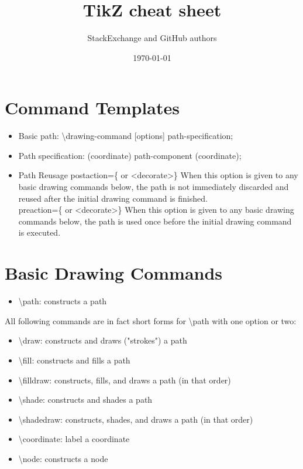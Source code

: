 \documentclass[a4paper,10pt]{article}
\newcommand{\myCode}[1]{\colorbox{gray!30}{#1}}
\begin{document}
\title{TikZ cheat sheet}
\author{StackExchange and GitHub authors}
\date{\today}

\section*{Command Templates}
\begin{itemize}
    \item Basic path: \myCode{\textbackslash drawing-command [options] path-specification;}
    \item Path specification: \myCode{(coordinate) path-component (coordinate);}
    \item Path Reusage  \myCode{postaction=\{<basic drawing commands> or <decorate>\}} When this option is given to any basic drawing commands below, the path is not immediately discarded and reused after the initial drawing command is finished. \\
            \myCode{preaction=\{<basic drawing commands> or <decorate>\}} When this option is given to any basic drawing commands below, the path is used once before the initial drawing command is executed. 
\end{itemize}

\section*{Basic Drawing Commands}
\begin{itemize}
    \item \myCode{\textbackslash path}: constructs a path
\end{itemize}

All following commands are in fact short forms for \myCode{\textbackslash path} with one option or two:
\begin{itemize}
    \item \myCode{\textbackslash draw}: constructs and draws ("strokes") a path
    \item \myCode{\textbackslash fill}: constructs and fills a path
    \item \myCode{\textbackslash filldraw}: constructs, fills, and draws a path (in that order)
    \item \myCode{\textbackslash shade}: constructs and shades a path
    \item \myCode{\textbackslash shadedraw}: constructs, shades, and draws a path (in that order)
    \item \myCode{\textbackslash coordinate}: label a coordinate
    \item \myCode{\textbackslash node}: constructs a node
\end{itemize}
\end{document}
